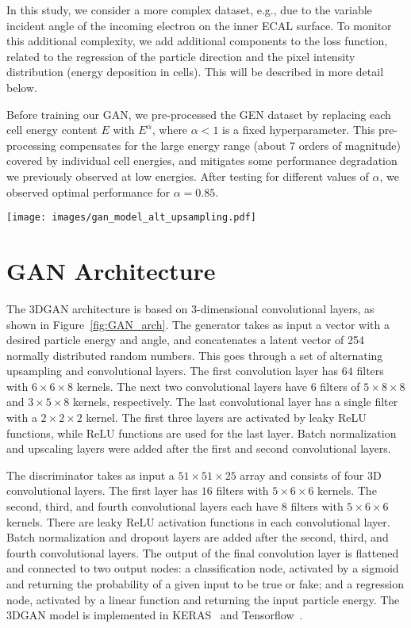  In this study, we consider a more complex dataset, e.g., due to the variable incident angle of the incoming electron on the inner ECAL surface. To monitor this additional complexity, we add additional components to the loss function, related to the regression of the particle direction and the pixel intensity distribution (energy deposition in cells). This will be described in more detail below.

Before training our GAN, we pre-processed the GEN dataset by replacing each cell energy content $E$ with $E^\alpha$, where $\alpha<1$ is a fixed hyperparameter. This pre-processing compensates for the large energy range (about 7 orders of magnitude) covered by individual cell energies, and mitigates some performance degradation we previously observed at low energies. After testing for different values of $\alpha$, we observed optimal performance for $\alpha=0.85$.

\begin{figure*}[htbp]
\centering
    \texttt{[image: images/gan\_model\_alt\_upsampling.pdf]}
    \caption{3DGAN generator and discriminator network architectures}
    \label{fig:GAN_arch}
\end{figure*}

\section{GAN Architecture}
\label{sec:GANarch}

The 3DGAN architecture is based on 3-dimensional convolutional layers, as shown in Figure~\ref{fig:GAN_arch}. The generator takes as input a vector with a desired particle energy and angle, and concatenates a latent vector of 254 normally distributed random numbers. This goes through a set of alternating upsampling and convolutional layers. The first convolution layer has $64$ filters with $6 \times 6 \times 8$ kernels. The next two convolutional layers have $6$ filters of $5 \times 8 \times 8$ and $3 \times 5 \times 8$ kernels, respectively. The last convolutional layer has a single filter with a $2 \times 2 \times 2$ kernel. The first three layers are activated by leaky ReLU functions, while ReLU functions are used for the last layer. Batch normalization and upscaling layers were added after the first and second convolutional layers.

The discriminator takes as input a $51  \times 51  \times 25$ array and consists of four 3D convolutional layers. The first layer has $16$ filters with $5 \times 6 \times 6$ kernels. The second, third, and fourth convolutional layers each have $8$ filters with $5 \times 6 \times 6$ kernels. There are leaky ReLU activation functions in each convolutional layer. Batch normalization and dropout layers are added after the second, third, and fourth convolutional layers. The output of the final convolution layer is flattened and connected to two output nodes: a classification node, activated by a sigmoid and returning the probability of a given input to be true or fake; and a regression node, activated by a linear function and returning the input particle energy.
The 3DGAN model is implemented in KERAS~\cite{keras} and Tensorflow~\cite{tensorflow2015-whitepaper}. 

